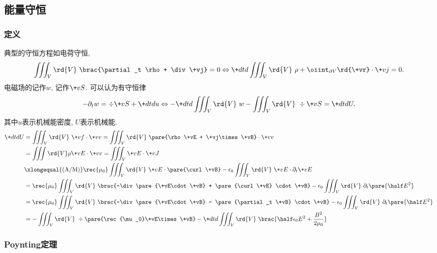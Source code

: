 \documentclass[hidelinks]{ctexart}
\begin{document}


\subsection{能量守恒} %
\label{sub:能量守恒}

\subsubsection{定义} %
\label{ssub:定义}

典型的守恒方程如电荷守恒,
\[ \iiint_V \rd{V}\ \brac{\partial_t \rho + \div \+vj} = 0 \Leftrightarrow \+dtd{}\iiint_V \rd{V}\ \rho + \oiint_{\partial V} \rd{\+vr}\cdot \+vj = 0. \]
电磁场的记作$w$, 记作$\+vS$. 可以认为有守恒律
\[ -\partial_t w = \div \+vS + \+dtdu \Leftrightarrow -\+dtd{} \iiint_V \rd{V}\ w - \iiint_V \rd{V}\ \div \+vS = \+dtdU. \]
其中$u$表示机械能密度, $U$表示机械能.
\begin{align*}
    \+dtdU &= \iiint_V \rd{V}\ \+vf\cdot \+vv = \iiint_V \rd{V} \ \pare{\rho \+vE + \+vj\times \+vB} \cdot \+vv \\
    &= \iiint \rd{V} \rho \+vE\cdot \+vv = \iiint_V \+vE\cdot \+vJ \\
    &\xlongequal{\mathrm{(A/M)}} \rec{\mu_0} \iiint_V \rd{V}\ \+vE\cdot \pare{\curl \+vB} - \epsilon_0 \iiint_V \rd{V}\ \+vE \cdot \partial_t \+vE \\
    &= \rec{\mu_0} \iiint_V \rd{V}\ \brac{-\div\pare{\+vE\cdot \+vB} + \pare{\curl \+vE} \cdot \+vB} - \epsilon_0 \iiint_V \rd{V} \ \partial_t \pare{\half E^2} \\
    &= \rec{\mu_0} \iiint_V \rd{V}\ \brac{-\div\pare{\+vE\cdot \+vB} - \pare{\partial_t \+vB} \cdot \+vB} - \epsilon_0 \iiint_V \rd{V} \ \partial_t \pare{\half E^2} \\
    &= - \iiint_V \rd{V}\ \div\pare{\rec{\mu_0}\+vE\times \+vB} - \+dtd{} \iiint_V \rd{V}\ \brac{\half \epsilon_0 E^2 + \frac{B^2}{2\mu_0}}
\end{align*}


\subsubsection{Poynting定理} %
\label{ssub:poynting定理}
\end{document}
